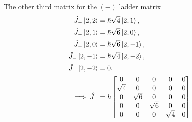 \documentclass[letter, 10pts]{article}
\begin{document}
The other third matrix for the $(-)$ ladder matrix 
\begin{align*}
\hat{J}_- \ket{2,2} &= \hbar \sqrt{4} \ket{2,1}, \\
\hat{J}_- \ket{2,1} &= \hbar \sqrt{6} \ket{2,0}, \\
\hat{J}_- \ket{2,0} &= \hbar \sqrt{6} \ket{2,-1}, \\
\hat{J}_- \ket{2,-1} &= \hbar \sqrt{4} \ket{2,-2}, \\
\hat{J}_- \ket{2,-2} &= 0. \\ 
\implies \hat{J}_- &= 
\hbar
\begin{bmatrix}
0 & 0 & 0 & 0 & 0 \\
\sqrt{4} & 0 & 0 & 0 & 0 \\
0 & \sqrt{6} & 0 & 0 & 0 \\
0 & 0 & \sqrt{6} & 0 & 0 \\
0 & 0 & 0 & \sqrt{4} & 0
\end{bmatrix}
\end{align*}
\end{document}

